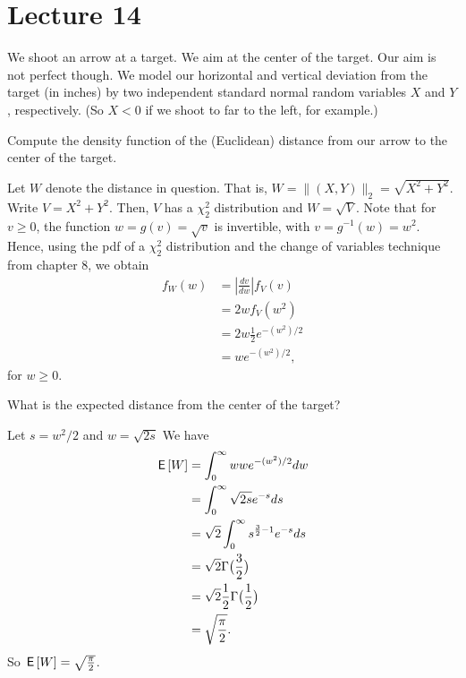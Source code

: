 \documentclass[lectures-questions]{subfiles}
\begin{document}
\section{Lecture 14}


We shoot an arrow at a target. We aim at the center of the target. Our aim is not perfect though. We model our horizontal and vertical deviation from the target (in inches) by two independent standard normal random variables $X$ and $Y$, respectively. (So $X<0$ if we shoot to far to the left, for example.)

\begin{exercise}
Compute the density function of the (Euclidean) distance from our arrow to the center of the target. %
\begin{solution}
Let $W$ denote the distance in question. That is, $W = \| (X,Y) \|_2 = \sqrt{X^2 + Y^2}$. Write $V = X^2 + Y^2$. Then, $V$ has a $\chi^2_2$ distribution and $W = \sqrt{V}$. Note that for $v \geq 0$, the function $w = g(v) = \sqrt{v}$ is invertible, with $v = g^{-1}(w) = w^2$. Hence, using the pdf of a $\chi^2_2$ distribution and the change of variables technique from chapter 8, we obtain
\begin{align}
    f_W(w) &=  |\frac{dv}{dw}| f_V(v) \\
    &= 2w f_V(w^2) \\
    &= 2w \frac{1}{2} e^{-(w^2)/2} \\
    &= w e^{-(w^2)/2},
\end{align}
for $w \geq 0$. 
\end{solution}
\end{exercise}


\begin{exercise}
What is the expected distance from the center of the target?
\begin{solution}

Let $s = w^2/2$ and $w = \sqrt{2s}$
We have
\begin{align}
    \,\mathsf{E}\left[W\right] &= \int_{0}^{\infty} w w e^{-(w^2)/2} dw \\
    &= \int_{0}^{\infty} \sqrt{2s} e^{-s} ds \\
    &= \sqrt{2}\int_{0}^{\infty} s^{\frac{3}{2}-1} e^{-s} ds \\
    &= \sqrt{2}\Gamma\big(\frac{3}{2}\big) \\
    &= \sqrt{2} \frac{1}{2}\Gamma\big(\frac{1}{2}\big) \\
    &= \sqrt{\frac{\pi}{2}}.
\end{align}
So $\,\mathsf{E}\left[W\right] = \sqrt{\frac{\pi}{2}}$.
\end{solution}
\end{exercise}
\end{document}
